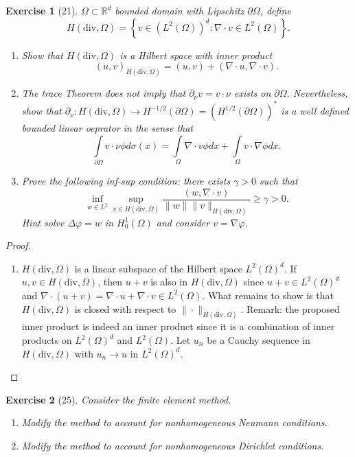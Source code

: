\documentclass[letterpaper,twoside,11pt]{article}
\theoremstyle{mystyle}
\newtheorem*{exercise}{Exercise}
\newcommand{\R}{{\mathbb R}}
\newcommand{\cbk}{\color{black}}
\newcommand{\cblu}{\color{blue}}
\newcommand{\Hdiv}{H\left( \text{div}, \Omega \right)}
\newcommand{\Ltwo}{L^2 \left( \Omega \right)}
\begin{document}
\newpage 
\begin{exercise}[21]
  $\Omega \subset \R^d$ bounded domain with Lipschitz $\partial \Omega$, define 
  \[H\left( \text{div}, \Omega \right) = \left\{ v\in (L^2(\Omega))^d : \nabla \cdot v \in L^2 (\Omega )\right\}.\]
\begin{enumerate}
  \item Show that $H\left( \text{div}, \Omega \right)$ is a Hilbert space with inner product 
  \[\left( u,v \right)_{H(\text{div}, \Omega)} = \left( u,v \right) + \left( \nabla \cdot u, \nabla \cdot v \right).\]
  \item The trace Theorem does not imply that $\partial_\nu v = v \cdot \nu$ exists on $\partial \Omega$. Nevertheless, show that $\partial_\nu : H\left( \text{div}, \Omega \right) \to H^{-1/2} \left( \partial \Omega \right) = \left( H^{1/2}(\partial \Omega) \right)^*$ is a well defined bounded linear oeprator in the sense that 
  \[\int\limits_{\partial \Omega} v \cdot \nu \phi d\sigma(x) = \int\limits_{\Omega} \nabla \cdot v \phi dx + \int\limits_{\Omega} v\cdot \nabla \phi dx.\]
  \item Prove the following inf-sup condition: there exists $\gamma > 0$ such that 
  \[\inf_{w\in L^2} \sup_{v\in H(\text{div},\Omega)} \frac{(w, \nabla \cdot v)}{\|w\| \|v\|_{H(\text{div}, \Omega)}}\geq \gamma > 0.\]
  Hint solve $\Delta \varphi = w$ in $H_0^1 \left( \Omega \right)$ and consider $v  = \nabla \varphi$. 

\end{enumerate}
\end{exercise}

\cblu
\begin{proof}
  \begin{enumerate}
    \item $\Hdiv$ is a linear subspace of the Hilbert space $\Ltwo^d$. If $u, v \in \Hdiv$, then $u + v$ is also in $\Hdiv$ since $u + v \in \Ltwo^d $ and $\nabla \cdot \left( u+v \right) = \nabla \cdot u + \nabla \cdot v \in \Ltwo$. What remains to show is that $\Hdiv$ is closed with respect to $\|\cdot\|_{\Hdiv}$. Remark: the proposed inner product is indeed an inner product since it is a combination of inner products on $\Ltwo^d$ and $\Ltwo$. Let $u_n$ be a Cauchy sequence in $\Hdiv$ with $u_n \to u$ in $\Ltwo^d$. 
  \end{enumerate}
\end{proof}
\cbk 




\newpage 
\begin{exercise}[25] 
  Consider the finite element method. 
  \begin{enumerate}
    \item Modify the method to account for nonhomogeneous Neumann conditions. 
    \item Modify the method to account for nonhomogeneous Dirichlet conditions. 
  \end{enumerate}
\end{exercise}
\end{document}

